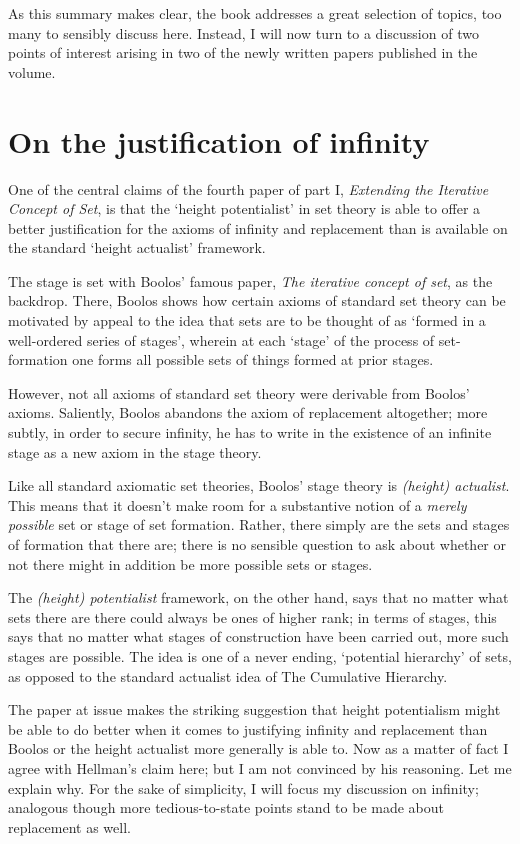 \documentclass{amsart}
\theoremstyle{definition}
\begin{document}
As this summary makes clear, the book addresses a great
selection of topics, too many to sensibly discuss here. Instead, 
I will now turn to a discussion of two points of interest 
arising in two of the newly written papers published in the volume.

\section{On the justification of infinity}

One of the central claims of the fourth paper of part I, 
\emph{Extending the Iterative Concept of Set}, 
is that the `height potentialist' in set theory 
is able to offer a better justification for 
the axioms of infinity and replacement
than is available on the standard `height actualist' framework.

The stage is set with Boolos' famous paper,
\emph{The iterative concept of set},
as the backdrop. There, 
Boolos shows how certain axioms of standard set theory 
can be motivated by appeal to 
the idea that sets are to be thought of as 
`formed in a well-ordered series of stages',
wherein at each `stage' of the process of set-formation 
one forms all possible sets 
of things formed at prior stages. 

However,
not all axioms of standard set theory were derivable 
from Boolos' axioms. Saliently, Boolos abandons the axiom of replacement 
altogether; more subtly, in order to secure infinity, 
he has to write in the existence of an infinite stage as a new axiom 
in the stage theory.

Like all standard axiomatic set theories, Boolos' stage theory is
\emph{(height) actualist}. This means that it doesn't make room for 
a substantive notion of a \emph{merely possible} set or stage of set formation.
Rather, there simply are the sets and stages of formation that there are;
there is no sensible question to ask about whether or not there might in addition be
more possible sets or stages.

The \emph{(height) potentialist} framework, on the other hand, 
says that no matter what sets there are there could always be ones of higher rank;
in terms of stages, this says that 
no matter what stages of construction have been carried out,
more such stages are possible. The idea is one of a never ending, 
`potential hierarchy' of sets, as opposed to the standard actualist 
idea of The Cumulative Hierarchy.

The paper at issue makes the striking suggestion that height potentialism
might be able to do better 
when it comes to justifying infinity and replacement 
than Boolos or the height actualist more generally is able to. 
Now as a matter of fact I agree with Hellman's claim here;
but I am not convinced by his reasoning.
Let me explain why. For the sake of simplicity, I will focus my discussion on infinity; 
analogous though more tedious-to-state points stand to be made 
about replacement as well.
\end{document}
